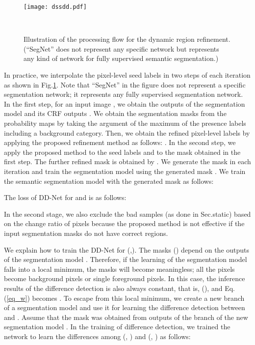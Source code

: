 \documentclass[10pt,twocolumn,letterpaper]{article}
\begin{document}
\begin{figure}[tb]
\begin{center}
\texttt{[image: dssdd.pdf]}
\caption{
Illustration of the processing flow for the dynamic region refinement. 
(``SegNet'' does not represent any specific network but represents any kind of network for fully supervised semantic segmentation.)
} \label{fig_dssdd}
\vskip -5mm~
\end{center}
\end{figure}

In practice, we interpolate the pixel-level seed labels in two steps of each iteration as shown in Fig.\ref{fig_dssdd}.
Note that ``SegNet'' in the figure does not represent a specific segmentation network; it represents any fully supervised segmentation network. 
In the first step, for an input image , we obtain the outputs of the segmentation model  and its CRF outputs . 
We obtain the segmentation masks  from the probability maps  by taking the argument of the maximum of the presence labels including a background category.
Then, we obtain the refined pixel-level labels  by applying the proposed refinement method as follows:
.
In the second step, we apply the 
proposed method to the seed labels  and to the mask  obtained in the first step.
The further refined mask  is obtained by
.
We generate the mask  in each iteration and train the segmentation model using the generated mask .
We train the semantic segmentation model with the generated mask  as follows:


The loss of DD-Net for  and  is as follows:

In the second stage,
we also exclude the bad samples (as done in Sec.{static}) based on the change ratio of pixels because the proposed method
is not effective if the input segmentation masks do not have correct regions.

We explain how to train the DD-Net for (,).
The masks () depend on the outputs of the segmentation model .
Therefore, if the learning of the segmentation model falls into a  local minimum, the masks will become meaningless; all the pixels become background pixels or single foreground pixels.
In this case, the inference results of the difference detection is also always constant, 
that is, (), and Eq.(\ref{eq_w}) becomes . 
To escape from this local minimum, we create a new branch of a segmentation model and use it for learning the difference detection between  and .
Assume that the mask  was obtained from outputs of the branch of the new segmentation model .
In the training of difference detection, we trained the network to learn the differences among (, ) and (, ) as follows:
\end{document}
